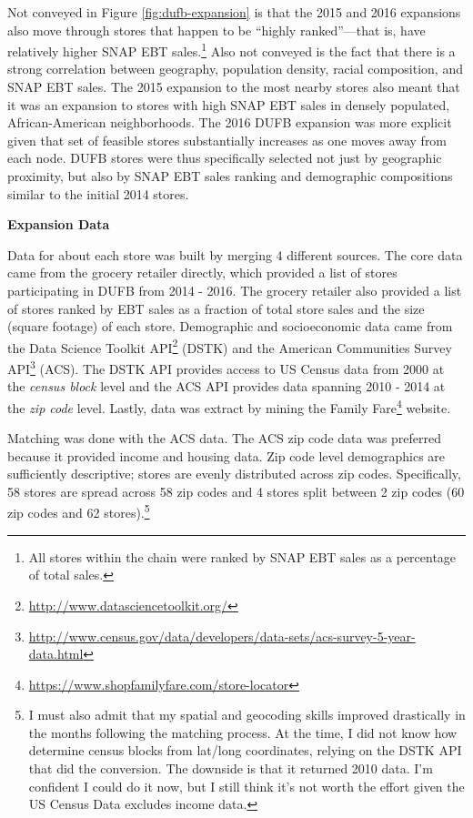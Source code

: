 \documentclass[12pt,letterpaperpaper,]{book}
\renewcommand{\href}[2]{#2\footnote{\url{#1}}}
\begin{document}
Not conveyed in Figure \ref{fig:dufb-expansion} is that the 2015 and
2016 expansions also move through stores that happen to be ``highly
ranked''---that is, have relatively higher SNAP EBT sales.\footnote{All
  stores within the chain were ranked by SNAP EBT sales as a percentage
  of total sales.} Also not conveyed is the fact that there is a strong
correlation between geography, population density, racial composition,
and SNAP EBT sales. The 2015 expansion to the most nearby stores also
meant that it was an expansion to stores with high SNAP EBT sales in
densely populated, African-American neighborhoods. The 2016 DUFB
expansion was more explicit given that set of feasible stores
substantially increases as one moves away from each node. DUFB stores
were thus specifically selected not just by geographic proximity, but
also by SNAP EBT sales ranking and demographic compositions similar to
the initial 2014 stores.

\textbf{Expansion Data}

Data for about each store was built by merging 4 different sources. The
core data came from the grocery retailer directly, which provided a list
of stores participating in DUFB from 2014 - 2016. The grocery retailer
also provided a list of stores ranked by EBT sales as a fraction of
total store sales and the size (square footage) of each store.
Demographic and socioeconomic data came from the
\href{http://www.datasciencetoolkit.org/}{Data Science Toolkit API}
(DSTK) and the
\href{http://www.census.gov/data/developers/data-sets/acs-survey-5-year-data.html}{American
Communities Survey API} (ACS). The DSTK API provides access to US Census
data from 2000 at the \emph{census block} level and the ACS API provides
data spanning 2010 - 2014 at the \emph{zip code} level. Lastly, data was
extract by mining the
\href{https://www.shopfamilyfare.com/store-locator}{Family Fare}
website.

Matching was done with the ACS data. The ACS zip code data was preferred
because it provided income and housing data. Zip code level demographics
are sufficiently descriptive; stores are evenly distributed across zip
codes. Specifically, 58 stores are spread across 58 zip codes and 4
stores split between 2 zip codes (60 zip codes and 62 stores).\footnote{I
  must also admit that my spatial and geocoding skills improved
  drastically in the months following the matching process. At the time,
  I did not know how determine census blocks from lat/long coordinates,
  relying on the DSTK API that did the conversion. The downside is that
  it returned 2010 data. I'm confident I could do it now, but I still
  think it's not worth the effort given the US Census Data excludes
  income data.}
\end{document}
